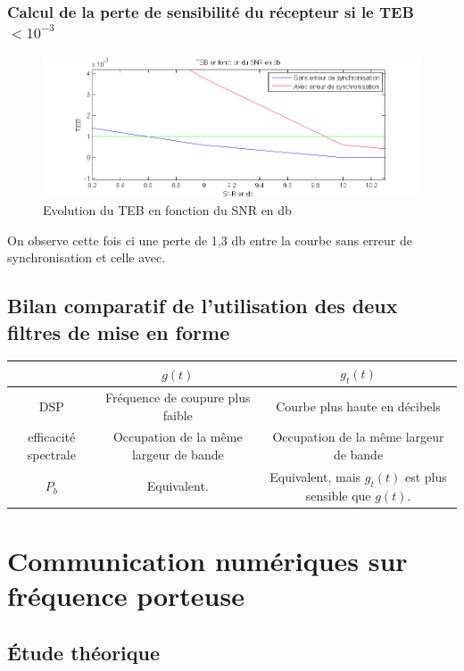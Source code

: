 \documentclass[11pt]{article}
\begin{document}
		\subsubsection{Calcul de la perte de sensibilité du récepteur si le TEB $< 10^{-3}$}
			\begin{figure}[!ht]
				\centering
				\includegraphics[scale=0.5]{images/Q318-7.png}
				\caption{Evolution du TEB en fonction du SNR en db}
				\label{Q318-5-6-2}
			\end{figure}
			On observe cette fois ci une perte de 1,3 db entre la courbe sans erreur de synchronisation et celle avec.
	
	\subsection{Bilan comparatif de l'utilisation des deux filtres de mise en forme}
	\begin{center}
		\begin{tabular}{|c|c|c|}
			\hline
			& $g(t)$ & $g_t(t)$ \\
			\hline
			DSP  & Fréquence de coupure plus faible & Courbe plus haute en décibels \\
			\hline
			efficacité spectrale & Occupation de la même largeur de bande & Occupation de la même largeur de bande\\
			\hline
			$P_b$ & Equivalent. & Equivalent, mais $g_t(t)$ est plus sensible que $g(t).$\\
			\hline
		\end{tabular}
	\end{center}
		

\section{Communication numériques sur fréquence porteuse}
	\subsection{Étude théorique}
\end{document}
